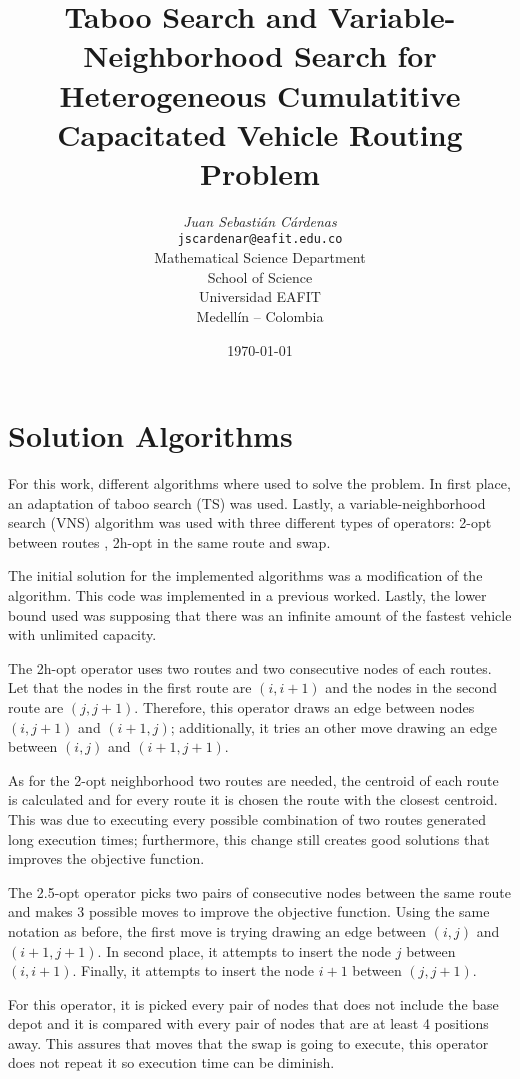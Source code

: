\documentclass[10pt,twoside]{article}
\title{Taboo Search and Variable-Neighborhood Search for Heterogeneous Cumulatitive Capacitated Vehicle Routing Problem}
\author{\emph{Juan Sebastián Cárdenas}\\
\vspace{0.3cm}
\small{\tt{jscardenar@eafit.edu.co}}\\
Mathematical Science Department\\
School of Science\\
Universidad EAFIT\\
Medellín -- Colombia}
\date{\today}
\begin{document}
\maketitle

\thispagestyle{firststyle}

\section{Solution Algorithms}\label{sec_alg}
For this work, different algorithms where used to solve the
problem. In first place, an adaptation of taboo search (TS)
\citep{glover1977} was used. Lastly, a variable-neighborhood search
(VNS) algorithm was used with three different types of operators:
2-opt between routes \citep{croes1958}, 2h-opt in the same route
\citep{bentley1992} and swap.

The initial solution for the implemented algorithms was a modification
of the \cite{clarke1964} algorithm. This code was implemented in a
previous worked. Lastly, the lower bound used was supposing that there
was an infinite amount of the fastest vehicle with unlimited capacity.

The 2h-opt operator uses two routes and two consecutive nodes of
each routes. Let that the nodes in the first route are $(i, i+1)$ and
the nodes in the second route are $(j, j + 1)$. Therefore, this
operator draws an edge between nodes $(i, j + 1)$ and $(i + 1, j)$;
additionally, it tries an other move drawing an edge between $(i, j)$
and $(i + 1, j + 1)$.

As for the 2-opt neighborhood two routes are needed, the centroid of
each route is calculated and for every route it is chosen the route
with the closest centroid. This was due to executing every possible
combination of two routes generated long execution times; furthermore,
this change still creates good solutions that improves the objective
function.

The 2.5-opt operator picks two pairs of consecutive nodes between the
same route and makes 3 possible moves to improve the objective
function. Using the same notation as before, the first move is trying
drawing an edge between $(i, j)$ and $(i + 1, j + 1)$. In second
place, it attempts to insert the node $j$ between $(i, i+1)$. Finally,
it attempts to insert the node $i + 1$ between $(j, j + 1)$.

For this operator, it is picked every pair of nodes that does not
include the base depot and it is compared with every pair of nodes
that are at least 4 positions away. This assures that moves that the
swap is going to execute, this operator does not repeat it so
execution time can be diminish.
\end{document}

